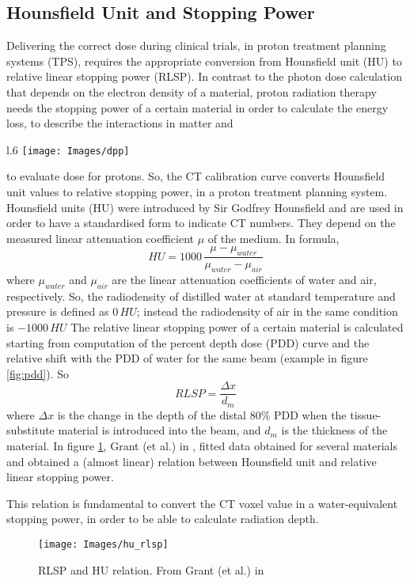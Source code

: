 \documentclass[12pt, a4paper, twoside]{book}
\begin{document}
\subsection{Hounsfield Unit and Stopping Power}
Delivering the correct dose during clinical trials, in proton treatment planning systems (TPS), requires the appropriate conversion from Hounsfield unit (HU) to relative linear stopping power (RLSP). In contrast to the photon dose calculation that depends on the electron density of a material, proton radiation therapy  needs the stopping power of a certain material in order to calculate the energy loss, to describe the interactions in matter and
\begin{wrapfigure}{l}{.6\textwidth}
{\texttt{[image: Images/dpp]}}
\caption{PDD example. Grant (et al.) \cite{gra:hu}}
\label{fig:pdd}
\end{wrapfigure}
\noindent to evaluate dose for protons. So, the CT calibration curve converts Hounsfield unit values to relative stopping power, in a proton treatment planning system.
Hounsfield units (HU) were introduced by Sir Godfrey Hounsfield and are used in order to have a standardised form to indicate CT numbers.
They depend on the measured linear attenuation coefficient $\mu$ of the medium.
In formula,
\[
HU=1000\,\frac {\mu -\mu _{water}}{\mu _{water}-\mu _{air}}
\]
where $\mu _{water}$ and $\mu _{air}$ are the linear attenuation coefficients of water and air, respectively.
So, the radiodensity of distilled water at standard temperature and pressure is defined as $0\,HU$; instead the radiodensity of air in the same condition is $-1000\,HU$
The relative linear stopping power of a certain material is calculated starting from computation of the percent depth dose (PDD) curve and the relative shift with the PDD of water for the same beam (example in figure \ref{fig:pdd}).
So
\[
RLSP = \frac{\Delta x}{d_m}
\]
where $\Delta x$ is the change in the depth of the distal $80\%$ PDD when the tissue-substitute material is introduced into the beam, and $d_m$ is the thickness of the material.
In figure \ref{fig:HU}, Grant (et al.) in \cite{gra:hu}, fitted data obtained for several materials and obtained a (almost linear) relation between Hounsfield unit and relative linear stopping power.

This relation is fundamental to convert the CT voxel value in a water-equivalent stopping power, in order to be able to calculate radiation depth.
\begin{figure}[t]
\centering
{\texttt{[image: Images/hu\_rlsp]}}
\caption{RLSP and HU relation. From Grant (et al.) in \cite{gra:hu}}
\label{fig:HU}
\end{figure}
\end{document}
